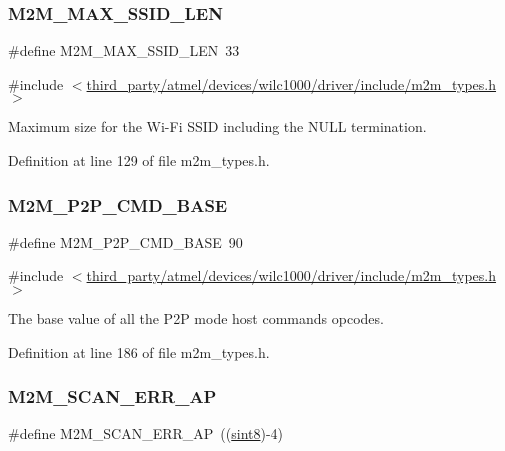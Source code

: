 \subsubsection{\texorpdfstring{M2\+M\+\_\+\+M\+A\+X\+\_\+\+S\+S\+I\+D\+\_\+\+L\+EN}{M2M\_MAX\_SSID\_LEN}}
{\footnotesize\ttfamily \#define M2\+M\+\_\+\+M\+A\+X\+\_\+\+S\+S\+I\+D\+\_\+\+L\+EN~33}



{\ttfamily \#include $<$\hyperlink{m2m__types_8h}{third\+\_\+party/atmel/devices/wilc1000/driver/include/m2m\+\_\+types.\+h}$>$}

Maximum size for the Wi-\/\+Fi S\+S\+ID including the N\+U\+LL termination. 

Definition at line 129 of file m2m\+\_\+types.\+h.

\mbox{\label{group__WlanDefines_ga4063cac8470b367f1aa45df7d057345a}} 
\subsubsection{\texorpdfstring{M2\+M\+\_\+\+P2\+P\+\_\+\+C\+M\+D\+\_\+\+B\+A\+SE}{M2M\_P2P\_CMD\_BASE}}
{\footnotesize\ttfamily \#define M2\+M\+\_\+\+P2\+P\+\_\+\+C\+M\+D\+\_\+\+B\+A\+SE~90}



{\ttfamily \#include $<$\hyperlink{m2m__types_8h}{third\+\_\+party/atmel/devices/wilc1000/driver/include/m2m\+\_\+types.\+h}$>$}

The base value of all the P2P mode host commands opcodes. 

Definition at line 186 of file m2m\+\_\+types.\+h.

\mbox{\label{group__WlanDefines_ga827d6a8e447449c6bb4b6c97943d22ba}} 
\subsubsection{\texorpdfstring{M2\+M\+\_\+\+S\+C\+A\+N\+\_\+\+E\+R\+R\+\_\+\+AP}{M2M\_SCAN\_ERR\_AP}}
{\footnotesize\ttfamily \#define M2\+M\+\_\+\+S\+C\+A\+N\+\_\+\+E\+R\+R\+\_\+\+AP~((\hyperlink{group__DataT_gae35f10ffd0ac8dd2bc3e794da9bdfbc7}{sint8})-\/4)}



